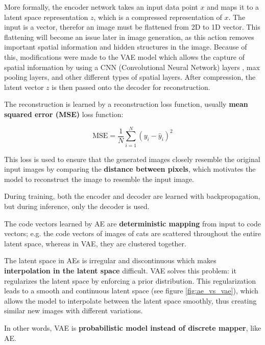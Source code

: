More formally, the encoder network takes an input data point $x$ and maps it to a latent space representation $z$, which is a compressed representation of $x$. The input is a vector, therefor an image must be flattened from 2D to 1D vector. This flattening will become an issue later in image generation, as this action removes important spatial information and hidden structures in the image. Because of this, modifications were made to the VAE model which allows the capture of spatial information by using a CNN (Convolutional Neural Network) \cite{cnn} layers \cite{vae_cnn_example}, max pooling layers, and other different types of spatial layers. After compression, the latent vector $z$ is then passed onto the decoder for reconstruction. 

The reconstruction is learned by a reconstruction loss function, usually \textbf{mean squared error (MSE)} loss function:

\begin{equation}
    \text{MSE} = \frac{1}{N} \sum_{i=1}^{N} (y_i - \hat{y}_i)^2
\label{eq:mse}
\end{equation}

This loss is used to ensure that the generated images closely resemble the original input images by comparing the \textbf{distance between pixels}, which motivates the model to reconstruct the image to resemble the input image.

During training, both the encoder and decoder are learned with backpropagation, but during inference, only the decoder is used.

The code vectors learned by AE are \textbf{deterministic mapping} from input to code vectors; e.g. the code vectors of images of cats are scattered throughout the entire latent space, whereas in VAE, they are clustered together. 

The latent space in AEs is irregular and discontinuous which makes \textbf{interpolation in the latent space} difficult. VAE solves this problem: it regularizes the latent space by enforcing a prior distribution. This regularization leads to a smooth and continuous latent space (see figure \ref{fig:ae_vs_vae}), which allows the model to interpolate between the latent space smoothly, thus creating similar new images with different variations. 

In other words, VAE is \textbf{probabilistic model instead of discrete mapper}, like AE.

